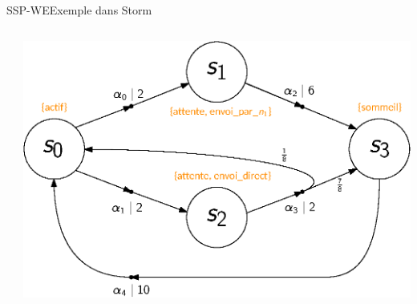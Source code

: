 \documentclass[compress]{beamer}
\theoremstyle{theorem}%
\begin{document}
\begin{frame}{SSP-WE}{Exemple dans Storm}
  \scriptsize
  \begin{columns}
    \begin{column}{0.5\linewidth}
  
    \end{column}
    \begin{column}{0.5\linewidth}
      \begin{center}
        \includegraphics[width=\linewidth]{resources/main-mdp3}
      \end{center}
    \end{column}
  \end{columns}
\end{frame}
\end{document}

